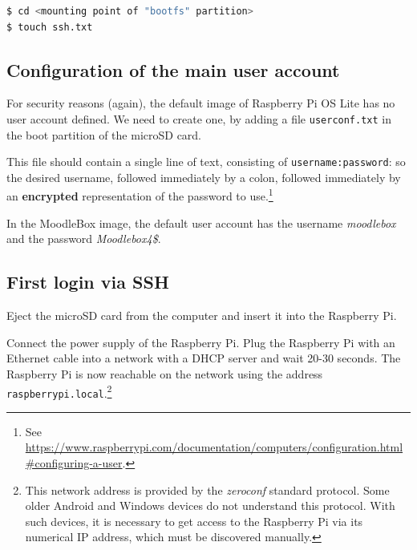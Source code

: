 \documentclass[12pt]{article}
\begin{document}
\begin{lstlisting}[language=bash]
$ cd <mounting point of "bootfs" partition>
$ touch ssh.txt
\end{lstlisting}

\subsection{Configuration of the main user account}\label{ssec-new-account}

For security reasons (again), the default image of Raspberry Pi OS Lite has no user account defined.
We need to create one, by adding a file \lstinline{userconf.txt} in the boot partition of the microSD card.

This file should contain a single line of text, consisting of \lstinline{username:password}: so the desired username, followed immediately by a colon, followed immediately by an \textbf{encrypted} representation of the password to use.\footnote{See \url{https://www.raspberrypi.com/documentation/computers/configuration.html\#configuring-a-user}.}

In the MoodleBox image, the default user account has the username \emph{moodlebox} and the password \emph{Moodlebox4\$}.

\subsection{First login via SSH}

Eject the microSD card from the computer and insert it into the Raspberry Pi.

Connect the power supply of the Raspberry Pi.
Plug the Raspberry Pi with an Ethernet cable into a network with a DHCP server and wait 20-30 seconds.
The Raspberry Pi is now reachable on the network using the address \lstinline{raspberrypi.local}.\footnote{This network address is provided by the \emph{zeroconf} standard protocol.
Some older Android and Windows devices do not understand this protocol.
With such devices, it is necessary to get access to the Raspberry Pi via its numerical IP address, which must be discovered manually.}

\end{document}
